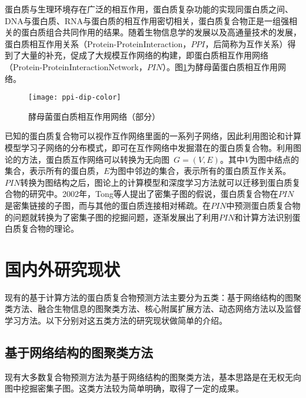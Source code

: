 蛋白质与生理环境存在广泛的相互作用，蛋白质复杂功能的实现同蛋白质之间、DNA与蛋白质、RNA与蛋白质的相互作用密切相关，蛋白质复合物正是一组强相关的蛋白质组合共同作用的结果。随着生物信息学的发展以及高通量技术的发展，蛋白质相互作用关系（Protein-ProteinInteraction，$PPI$，后简称为互作关系）得到了大量的补充，促成了大规模互作网络的构建\cite{butland_interaction_2005}，即蛋白质相互作用网络（Protein-ProteinInteractionNetwork，$PIN$）。图\ref{fig:ppi}为酵母菌蛋白质相互作用网络。
\begin{figure}[htbp]
  \centering
  \texttt{[image: ppi-dip-color]}
  \caption{酵母菌蛋白质相互作用网络（部分）}
  \label{fig:ppi}
\end{figure}
已知的蛋白质复合物可以视作互作网络里面的一系列子网络，因此利用图论和计算模型学习子网络的分布模式，即可在互作网络中发掘潜在的蛋白质复合物\cite{legrain_proteinprotein_2001}。利用图论的方法，蛋白质互作网络可以转换为无向图~$G=(V,E)$。其中$V$为图中结点的集合，表示所有的蛋白质，$E$为图中邻边的集合，表示所有的蛋白质互作关系。$PIN$转换为图结构之后，图论上的计算模型和深度学习方法就可以迁移到蛋白质复合物的研究中。2002年，Tong\cite{tong_combined_2002}等人提出了密集子图的假说，蛋白质复合物在$PIN$是密集链接的子图，而与其他的蛋白质连接相对稀疏。在$PIN$中预测蛋白质复合物的问题就转换为了密集子图的挖掘问题，逐渐发展出了利用$PIN$和计算方法识别蛋白质复合物的理论。

\section{国内外研究现状}
\label{section:intro:research}

现有的基于计算方法的蛋白质复合物预测方法主要分为五类：基于网络结构的图聚类方法、融合生物信息的图聚类方法、核心附属扩展方法、动态网络方法以及监督学习方法。以下分别对这五类方法的研究现状做简单的介绍。

\subsection{基于网络结构的图聚类方法}
\label{subsection:research:TopologyMethod}

现有大多数复合物预测方法为基于网络结构的图聚类方法，基本思路是在无权无向图中挖掘密集子图。这类方法较为简单明确，取得了一定的成果。

